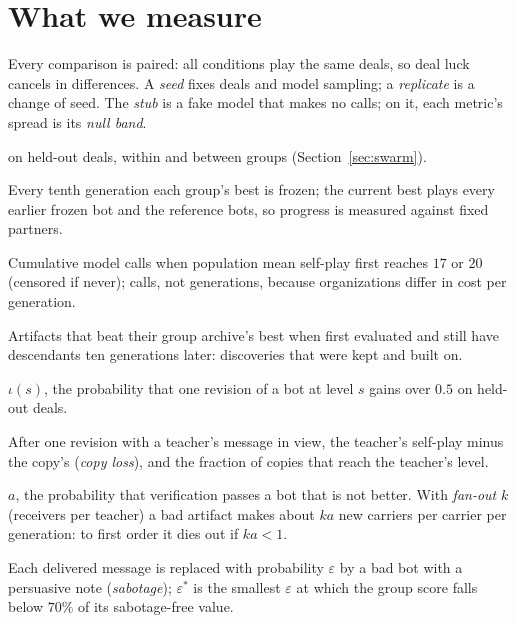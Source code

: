 \documentclass[11pt]{article}
\numberwithin{theorem}{section}
\theoremstyle{definition}
\begin{document}
\section{What we measure}\label{sec:measure}

Every comparison is paired: all conditions play the same deals, so deal luck cancels in differences. A \emph{seed}
fixes deals and model sampling; a \emph{replicate} is a change of seed. The \emph{stub} is a fake model that makes no
calls; on it, each metric's spread is its \emph{null band}.

\begin{description}[leftmargin=0pt,itemsep=0pt]
\item[Self-play, cross-play] on held-out deals, within and between groups (Section~\ref{sec:swarm}).
\item[Frozen ladder.] Every tenth generation each group's best is frozen; the current best plays every earlier frozen
bot and the reference bots, so progress is measured against fixed partners.
\item[Calls-to-threshold.] Cumulative model calls when population mean self-play first reaches $17$ or $20$ (censored if
never); calls, not generations, because organizations differ in cost per generation.
\item[Retained innovations.] Artifacts that beat their group archive's best when first evaluated and still have
descendants ten generations later: discoveries that were kept and built on.
\item[Innovation rate.] $\iota(s)$, the probability that one revision of a bot at level $s$ gains over $0.5$ on
held-out deals.
\item[Copy fidelity.] After one revision with a teacher's message in view, the teacher's self-play minus the copy's
(\emph{copy loss}), and the fraction of copies that reach the teacher's level.
\item[Leak rate.] $a$, the probability that verification passes a bot that is not better. With \emph{fan-out} $k$
(receivers per teacher) a bad
artifact makes about $ka$ new carriers per carrier per generation: to first order it dies out if $ka<1$.
\item[Breakdown point.] Each delivered message is replaced with probability $\varepsilon$ by a bad bot with a persuasive
note (\emph{sabotage}); $\varepsilon^\ast$ is the smallest $\varepsilon$ at which the group score falls below $70\%$ of
its sabotage-free value.
\end{description}
\end{document}
